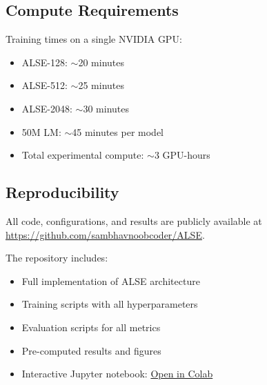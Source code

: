 \documentclass{article}
\begin{document}
\subsection{Compute Requirements}

Training times on a single NVIDIA GPU:
\begin{itemize}
    \item ALSE-128: $\sim$20 minutes
    \item ALSE-512: $\sim$25 minutes
    \item ALSE-2048: $\sim$30 minutes
    \item 50M LM: $\sim$45 minutes per model
    \item Total experimental compute: $\sim$3 GPU-hours
\end{itemize}

\subsection{Reproducibility}

All code, configurations, and results are publicly available at \href{https://github.com/sambhavnoobcoder/ALSE}{https://github.com/sambhavnoobcoder/ALSE}.

The repository includes:
\begin{itemize}
    \item Full implementation of ALSE architecture
    \item Training scripts with all hyperparameters
    \item Evaluation scripts for all metrics
    \item Pre-computed results and figures
    \item Interactive Jupyter notebook: \href{https://colab.research.google.com/drive/15wn3SQoT8p6sR2me62DemNr8XzaXH5Id}{Open in Colab}
\end{itemize}
\end{document}
